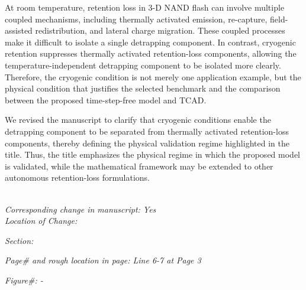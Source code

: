 \documentclass[11pt]{article}
\begin{document}
At room temperature, retention loss in 3-D NAND flash can involve multiple coupled mechanisms, including thermally activated emission, re-capture, field-assisted redistribution, and lateral charge migration.
These coupled processes make it difficult to isolate a single detrapping component.
In contrast, cryogenic retention suppresses thermally activated retention-loss components, allowing the temperature-independent detrapping component to be isolated more clearly.
Therefore, the cryogenic condition is not merely one application example, but the physical condition that justifies the selected benchmark and the comparison between the proposed time-step-free model and TCAD.

We revised the manuscript to clarify that cryogenic conditions enable the detrapping component to be separated from thermally activated retention-loss components, thereby defining the physical validation regime highlighted in the title.
Thus, the title emphasizes the physical regime in which the proposed model is validated, while the mathematical framework may be extended to other autonomous retention-loss formulations.

\noindent \textit{\\Corresponding change in manuscript: Yes \\Location of Change:}

\hspace{40pt} \noindent \textit{Section: \uppercase\expandafter{}}

\hspace{40pt} \noindent \textit{Page\# and rough location in page: Line 6-7 at Page 3}

\hspace{40pt} \noindent \textit{Figure\#: - }
\end{document}
